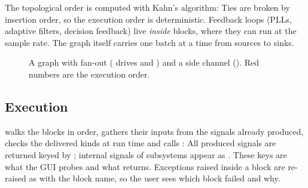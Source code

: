 The topological order is computed with Kahn's algorithm:
Ties are broken by insertion order, so the execution order is deterministic. Feedback loops
(PLLs, adaptive filters, decision feedback) live \emph{inside} blocks, where they can run at the
sample rate. The graph itself carries one batch at a time from sources to sinks.

\begin{figure}[htbp]
\centering
{}
\caption{A graph with fan-out ( drives  and ) and a
side channel (). Red numbers are the execution order.}
\end{figure}

\subsection{Execution}
 walks the blocks in order, gathers their inputs from the signals
already produced, checks the delivered kinds at run time and calls :
All produced signals are returned keyed by ; internal signals of
subsystems appear as . These keys are what the GUI probes and what
 returns. Exceptions raised inside a block are re-raised as
 with the block name, so the user sees which block failed and why.


